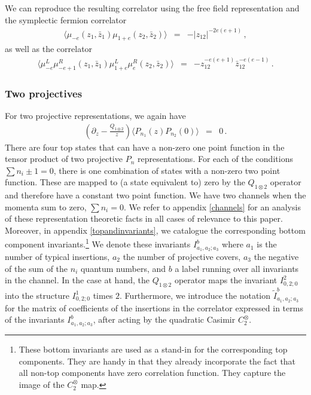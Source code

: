 \documentclass[12pt]{article}
\numberwithin{equation}{section}
\numberwithin{equation}{section}
\numberwithin{table}{section}\setlength{\multlinegap}{25pt}
\begin{document}
We can reproduce the resulting correlator using the free field representation and the  symplectic fermion correlator \cite{Kausch:2000fu}
\begin{eqnarray}
\langle \mu_{-e}(z_1,\bar{z}_1) \mu_{1+e}(z_2,\bar{z}_2) \rangle &=& -|z_{12}|^{-2 e(e+1)} \, ,
\end{eqnarray}
as well as the correlator
\begin{eqnarray}
\langle \mu^L_{-e} \mu^R_{-e+1}  (z_1,\bar{z}_1) \mu^L_{1+e}  \mu^R_{e} (z_2,\bar{z}_2) \rangle &=& -z_{12}^{-e(e+1)} \bar{z}_{12}^{-e(e-1)}  \, .
\end{eqnarray}




\subsubsection{Two projectives}
For two projective representations, we again have
\begin{eqnarray}
(\partial_z - \frac{Q_{1 \otimes 2}}{z}) \langle P_{n_1}(z) P_{n_2}(0) \rangle &=& 0 \, .
\end{eqnarray}
There are four top states that can have a non-zero one point function in the tensor product of two projective $P_n$ representations.
For each of the conditions $\sum n_i \pm 1 =0$, there is one combination of states with a non-zero two point function. 
These are mapped to (a state equivalent to) zero by the $Q_{1 \otimes 2}$ 
operator and therefore have a constant two point function. 
We  have two channels when the momenta sum to zero,  $\sum n_i=0$. We refer to appendix \ref{channels} for an analysis of these representation
theoretic facts in all cases of relevance to this paper. Moreover, in appendix \ref{topandinvariants}, we catalogue the
corresponding bottom component invariants.\footnote{These bottom invariants are used as a stand-in for the corresponding top
components. They are handy in that they already incorporate the fact that all non-top components have zero correlation function.
They capture the image of the $C_2^{\otimes}$ map.} We denote these invariants $I_{a_1,a_2;a_3}^b$ where $a_1$ is the number of
typical insertions, $a_2$ the number of projective covers, $a_3$ the negative of the sum of the $n_i$ quantum numbers,
and $b$ a label running over all invariants in the channel.
In the case at hand, the $Q_{1 \otimes 2}$ operator maps the invariant $I_{0,2;0}^2$ into the structure $I_{0,2;0}^1$ times
$2$. Furthermore, we introduce 
the notation $\tilde{I}_{a_1,a_2;a_3}^b$  for the matrix of coefficients of the insertions in the correlator expressed in terms
of the invariants $I_{a_1,a_2;a_3}^b$, after acting by the quadratic Casimir $C_2^\otimes$.
\end{document}
